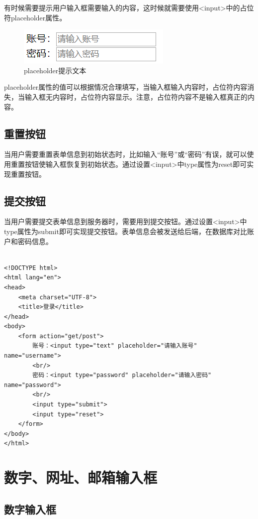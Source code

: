 有时候需要提示用户输入框需要输入的内容，这时候就需要使用<input>中的占位符placeholder属性。

\begin{figure}[H]
	\centering
	\includegraphics[]{img/C4/4-3/1.png}
	\caption{placeholder提示文本}
\end{figure}

placeholder属性的值可以根据情况合理填写，当输入框输入内容时，占位符内容消失，当输入框无内容时，占位符内容显示。注意，占位符内容不是输入框真正的内容。

\subsection{重置按钮}

当用户需要重置表单信息到初始状态时，比如输入“账号”或“密码”有误，就可以使用重置按钮使输入框恢复到初始状态。通过设置<input>中type属性为reset即可实现重置按钮。

\subsection{提交按钮}

当用户需要提交表单信息到服务器时，需要用到提交按钮。通过设置<input>中type属性为submit即可实现提交按钮。表单信息会被发送给后端，在数据库对比账户和密码信息。 \\

 \\
\begin{lstlisting}[style=htmlcssjs]
<!DOCTYPE html>
<html lang="en">
<head>
    <meta charset="UTF-8">
    <title>登录</title>
</head>
<body>
    <form action="get/post">
        账号：<input type="text" placeholder="请输入账号" name="username">
        <br/>
        密码：<input type="password" placeholder="请输入密码" name="password">
        <br/>
        <input type="submit">
        <input type="reset">
    </form>
</body>
</html>
\end{lstlisting}

\newpage

\section{数字、网址、邮箱输入框}

\subsection{数字输入框}

